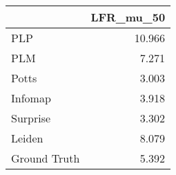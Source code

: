 \begin{tabular}{lr}
\toprule
{} & LFR_mu_50 \\
\midrule
PLP          &    10.966 \\
PLM          &     7.271 \\
Potts        &     3.003 \\
Infomap      &     3.918 \\
Surprise     &     3.302 \\
Leiden       &     8.079 \\
Ground Truth &     5.392 \\
\bottomrule
\end{tabular}
